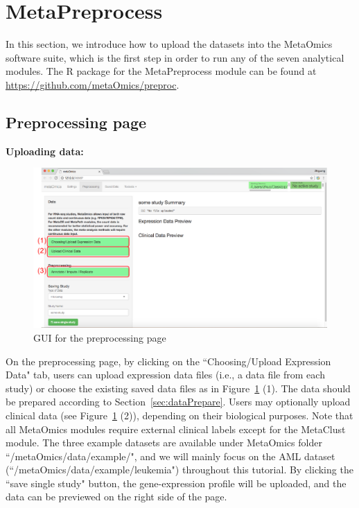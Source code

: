 

\section{MetaPreprocess}

In this section, we introduce how to upload the datasets into the MetaOmics software suite,
which is the first step in order to run any of the seven analytical modules.
The R package for the MetaPreprocess module can be found at \url{https://github.com/metaOmics/preproc}.

\subsection{Preprocessing page}
\label{sec:procedure}

\begin{steps}
\item \textbf{Uploading data:}

\begin{figure}[!htbp]
\begin{center}
\includegraphics[scale=1]{./figure/preprocessing/GUIpreprocessing}
\caption{GUI for the preprocessing page}
\label{fig:GUIpreprocessing}
\end{center}
\end{figure}

On the preprocessing page,
by clicking on the ``Choosing/Upload Expression Data" tab,
users can upload expression data files (i.e., a data file from each study) 
or choose the existing saved data files as in Figure~\ref{fig:GUIpreprocessing} {\color{red} (1)}.
The data should be prepared according to Section~\ref{sec:dataPrepare}.
Users may optionally upload clinical data (see Figure~\ref{fig:GUIpreprocessing} {\color{red} (2)}), 
depending on their biological purposes.
Note that all MetaOmics modules require external clinical labels except for the MetaClust module.
The three example datasets are available under MetaOmics folder ``/metaOmics/data/example/",
and we will mainly focus on the AML dataset (``/metaOmics/data/example/leukemia") throughout this tutorial.
By clicking the ``save single study" button, 
the gene-expression profile will be uploaded, 
and the data can be previewed on the right side of the page.



\end{steps}

